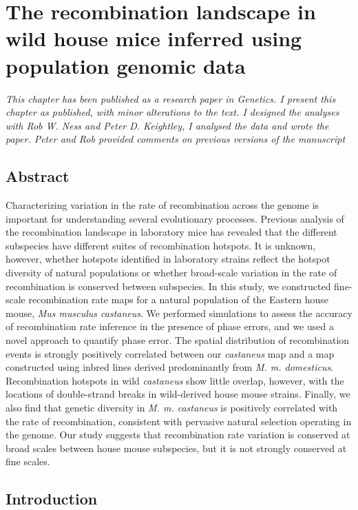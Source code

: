 \chapter{The recombination landscape in wild house mice inferred using population genomic data}

\textit{This chapter has been published as a research paper in Genetics. I present this chapter as published, with minor alterations to the text. I designed the analyses with Rob W. Ness and Peter D. Keightley, I analysed the data and wrote the paper. Peter and Rob provided comments on previous versions of the manuscript}

\section{Abstract}
 
Characterizing variation in the rate of recombination across the genome is important for understanding several evolutionary processes. Previous analysis of the recombination landscape in laboratory mice has revealed that the different subspecies have different suites of recombination hotspots. It is unknown, however, whether hotspots identified in laboratory strains reflect the hotspot diversity of natural populations or whether broad-scale variation in the rate of recombination is conserved between subspecies. In this study, we constructed fine-scale recombination rate maps for a natural population of the Eastern house mouse, \textit{Mus musculus castaneus}. We performed simulations to assess the accuracy of recombination rate inference in the presence of phase errors, and we used a novel approach to quantify phase error. The spatial distribution of recombination events is strongly positively correlated between our \textit{castaneus} map and a map constructed using inbred lines derived predominantly from \textit{M. m. domesticus}. Recombination hotspots in wild \textit{castaneus} show little overlap, however, with the locations of double-strand breaks in wild-derived house mouse strains. Finally, we also find that genetic diversity in \textit{\textit{M. m. castaneus}} is positively correlated with the rate of recombination, consistent with pervasive natural selection operating in the genome. Our study suggests that recombination rate variation is conserved at broad scales between house mouse subspecies, but it is not strongly conserved at fine scales.

\section{Introduction}
 
